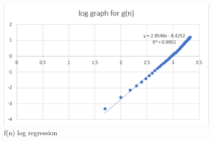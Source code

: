 \documentclass[titlepage, 12pt]{article}
\begin{document}
\begin{figure}[h]
    \includegraphics[width=\linewidth]{gn-2.png}
    \caption{f(n) log regression}
\end{figure}
\end{document}
